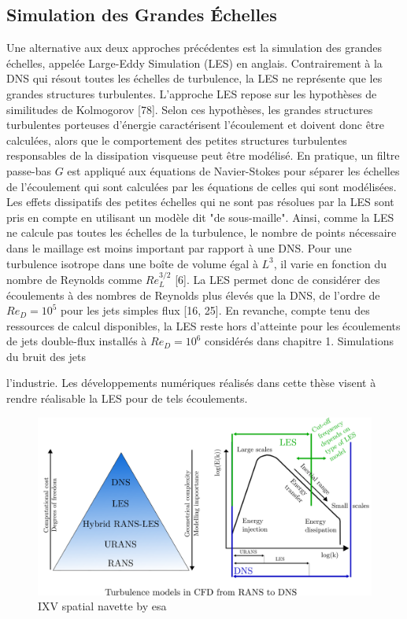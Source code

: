 
\subsection{Simulation des Grandes Échelles}

Une alternative aux deux approches précédentes est la simulation des grandes échelles, appelée Large-Eddy Simulation (LES) en anglais. Contrairement à la DNS qui résout toutes les échelles de turbulence, la LES ne représente que les grandes structures turbulentes. L'approche LES repose sur les hypothèses de similitudes de Kolmogorov [78]. Selon ces hypothèses, les grandes structures turbulentes porteuses d'énergie caractérisent l'écoulement et doivent donc être calculées, alors que le comportement des petites structures turbulentes responsables de la dissipation visqueuse peut être modélisé. En pratique, un filtre passe-bas $G$ est appliqué aux équations de Navier-Stokes pour séparer les échelles de l'écoulement qui sont calculées par les équations de celles qui sont modélisées. Les effets dissipatifs des petites échelles qui ne sont pas résolues par la LES sont pris en compte en utilisant un modèle dit "de sous-maille". Ainsi, comme la LES ne calcule pas toutes les échelles de la turbulence, le nombre de points nécessaire dans le maillage est moins important par rapport à une DNS. Pour une turbulence isotrope dans une boîte de volume égal à $L^{3}$, il varie en fonction du nombre de Reynolds comme $R e_{L}^{3 / 2}$ [6]. La LES permet donc de considérer des écoulements à des nombres de Reynolds plus élevés que la DNS, de l'ordre de $R e_{D}=10^{5}$ pour les jets simples flux [16, 25]. En revanche, compte tenu des ressources de calcul disponibles, la LES reste hors d'atteinte pour les écoulements de jets double-flux installés à $R e_{D}=10^{6}$ considérés dans chapitre 1. Simulations du bruit des jets

l'industrie. Les développements numériques réalisés dans cette thèse visent à rendre réalisable la LES pour de tels écoulements.

\begin{figure}[h!]
 \centering
 \includegraphics[width=1.0\linewidth]{chapter1_introduction/pictures/les.png}
 \vspace{-2ex}
 \caption{IXV spatial navette by esa}
  \vspace{2ex}
 \label{les}
\end{figure}
